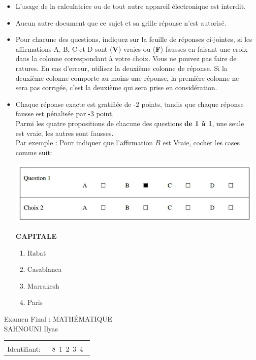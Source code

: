 \documentclass{book}%
\begin{document}
\begin{itemize}%
\item%
L'usage de la calculatrice ou de tout autre appareil électronique est interdit.%
\item%
Aucun autre document que ce sujet et sa grille réponse n'est autorisé.%
\item%
Pour chacune des questions, indiquez sur la feuille de réponses ci-jointes, si les affirmations A, B, C et D sont (\textbf{V}) vraies ou (\textbf{F}) fausses en faisant une croix dans la colonne correspondant à votre choix. Vous ne pouvez pas faire de ratures. En cas d'erreur, utilisez la deuxième colonne de réponse. Si la deuxième colonne comporte au moins une réponse, la première colonne ne sera pas corrigée, c'est la deuxième qui sera prise en considération.%
\item%
Chaque réponse exacte est gratifiée de -2 points, tandis que chaque réponse fausse est pénalisée par -3 point. \\ 	Parmi les quatre propositions de chacune des questions \textbf{de 1 à 1}, une seule est vraie, les autres sont fausses. \\ 	Par exemple : Pour indiquer que l'affirmation $B$ est Vraie, cocher les cases comme suit:  \\ \begin{center}	\includegraphics[scale=0.8]{reponses.png} \end{center}%
\thispagestyle{empty}%
\begin{exercise}%
\textbf{CAPITALE }%
\begin{enumerate}[label=\textbf{\Alph*. }]%
\item%
Rabat%
\item%
Casablanca%
\item%
Marrakesh%
\item%
Paris%
\end{enumerate}%
\end{exercise}%
\end{itemize}%
\newpage%
\thispagestyle{empty}%
Examen Final : MATHÉMATIQUE $\qquad \qquad \qquad \qquad \qquad \qquad \qquad \qquad$ SAHNOUNI Ilyas%
\begin{flushright}%
\begin{tabular}{|l|}%
\hline%
 \\%
\thispagestyle{empty}%
Identifiant: $\quad$ {\Large 8~1~2~3~4~}%
 \\%
\hline%
\end{tabular}%
\end{flushright}%
\end{document}
